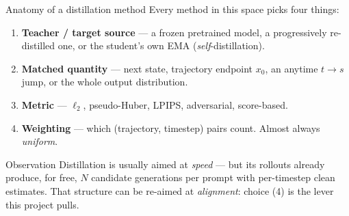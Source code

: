 \documentclass[aspectratio=169,10pt]{beamer}
\begin{document}
\begin{frame}{Anatomy of a distillation method}
  Every method in this space picks four things:
  \begin{enumerate}
    \item \textbf{Teacher / target source} --- a frozen pretrained model, a
      progressively re-distilled one, or the student's own EMA
      (\emph{self}-distillation).
    \item \textbf{Matched quantity} --- next state, trajectory endpoint $x_0$,
      an anytime $t \to s$ jump, or the whole output distribution.
    \item \textbf{Metric} --- $\ell_2$, pseudo-Huber, LPIPS, adversarial,
      score-based.
    \item \textbf{Weighting} --- which (trajectory, timestep) pairs count.
      Almost always \emph{uniform}.
  \end{enumerate}
  \vspace{0.6em}
  \begin{alertblock}{Observation}
    Distillation is usually aimed at \emph{speed} --- but its rollouts already
    produce, for free, $N$ candidate generations per prompt with per-timestep
    clean estimates. That structure can be re-aimed at \emph{alignment}: choice
    (4) is the lever this project pulls.
  \end{alertblock}
\end{frame}
\end{document}
